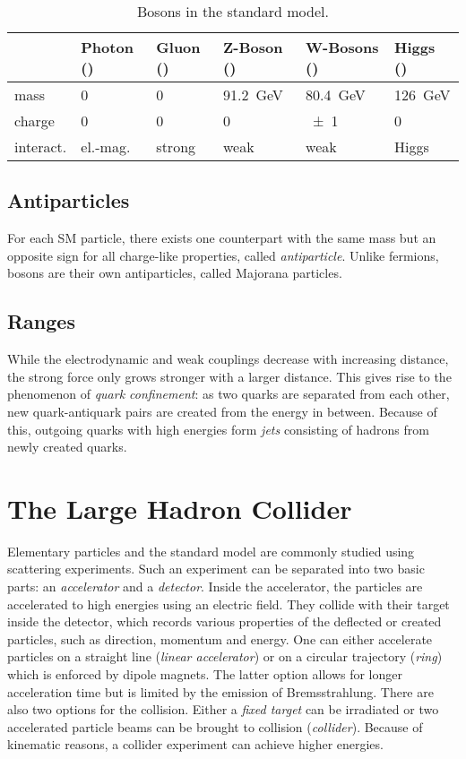 \begin{table}
	\centering
	\begin{tabular}{ l l l l l l }
		\toprule
		& {Photon (\Pgamma)} & {Gluon (\Pgluon)} & {Z-Boson (\PZ)} & {W-Bosons (\PWpm)} & {Higgs (\PHiggs)} \\
		\midrule
		{mass} & \num{0} & \num{0} & \SI{91.2}{\GeV} & \SI{80.4}{\GeV} & \SI{126}{\GeV} \\ 
		{charge} & \num{0} & \num{0} & \num{0} & \num{+- 1} & \num{0} \\ 
		{interact.} & {el.-mag.} & {strong} & {weak} & {weak} & {Higgs} \\
		\bottomrule
	\end{tabular}
	\caption{Bosons in the standard model\cite[p.~27]{Oo2014Review}.}
	\label{tbl:sm_bosons}
\end{table}

\subsection{Antiparticles}
For each SM particle, there exists one counterpart with the same mass but an opposite sign for all charge-like properties, called \emph{antiparticle}. Unlike fermions, bosons are their own antiparticles, called Majorana particles.

\subsection{Ranges}
While the electrodynamic and weak couplings decrease with increasing distance, the strong force only grows stronger with a larger distance. This gives rise to the phenomenon of \emph{quark confinement}: as two quarks are separated from each other, new quark-antiquark pairs are created from the energy in between. Because of this, outgoing quarks with high energies form \emph{jets} consisting of hadrons from newly created quarks.

\section{The Large Hadron Collider}
Elementary particles and the standard model are commonly studied using scattering experiments. Such an experiment can be separated into two basic parts: an \emph{accelerator} and a \emph{detector}.
Inside the accelerator, the particles are accelerated to high energies using an electric field. They collide with their target inside the detector, which records various properties of the deflected or created particles, such as direction, momentum and energy. 
One can either accelerate particles on a straight line (\emph{linear accelerator}) or on a circular trajectory (\emph{ring}) which is enforced by dipole magnets. The latter option allows for longer acceleration time but is limited by the emission of Bremsstrahlung.
There are also two options for the collision. Either a \emph{fixed target} can be irradiated or two accelerated particle beams can be brought to collision (\emph{collider}). Because of kinematic reasons, a collider experiment can achieve higher energies.

